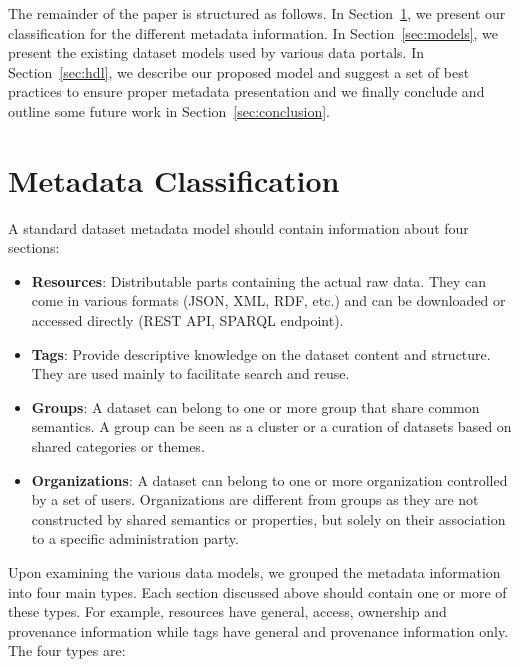 \documentclass[runningheads,a4paper]{llncs}
\begin{document}
The remainder of the paper is structured as follows. In Section~\ref{sec:metadata}, we present our classification for the different metadata information. In Section~\ref{sec:models}, we present the existing dataset models used by various data portals. In Section~\ref{sec:hdl}, we describe our proposed model and suggest a set of best practices to ensure proper metadata presentation and we finally conclude and outline some future work in Section~\ref{sec:conclusion}.

\section{Metadata Classification}
\label{sec:metadata}

A standard dataset metadata model should contain information about four sections:

\begin{itemize}
  \item \textbf{Resources}: Distributable parts containing the actual raw data. They can come in various formats (JSON, XML, RDF, etc.) and can be downloaded or accessed directly (REST API, SPARQL endpoint).
  \item \textbf{Tags}: Provide descriptive knowledge on the dataset content and structure. They are used mainly to facilitate search and reuse.
  \item \textbf{Groups}: A dataset can belong to one or more group that share common semantics. A group can be seen as a cluster or a curation of datasets based on shared categories or themes.
  \item \textbf{Organizations}: A dataset can belong to one or more organization controlled by a set of users. Organizations are different from groups as they are not constructed by shared semantics or properties, but solely on their association to a specific administration party.
\end{itemize}

Upon examining the various data models, we grouped the metadata information into four main types. Each section discussed above should contain one or more of these types. For example, resources have general, access, ownership and provenance information while tags have general and provenance information only. The four types are:
\end{document}
